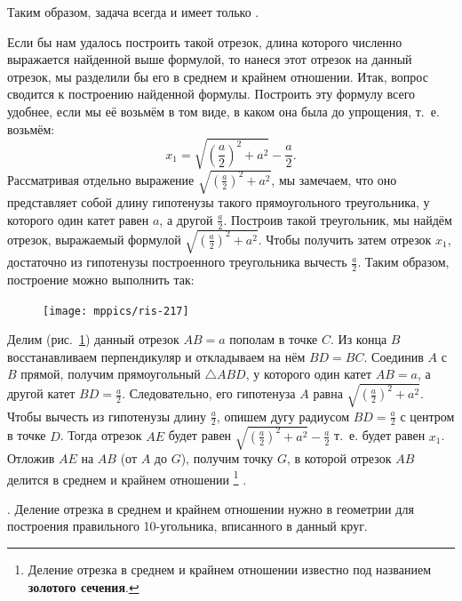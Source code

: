 \documentclass[oneside]{book}
\begin{document}
Таким образом, задача всегда  и имеет только . %

Если бы нам удалось построить такой отрезок, длина которого численно выражается найденной выше формулой, то нанеся этот отрезок на данный отрезок, мы разделили бы его в среднем и крайнем отношении.
Итак, вопрос сводится к построению найденной формулы.
Построить эту формулу всего удобнее, если мы её возьмём в том виде, в каком она была до упрощения, т.~е. возьмём:
\[x_1= \sqrt{\left(\frac a2\right)^2+a^2}-\frac a2.\]
Рассматривая отдельно выражение $\sqrt{\left(\frac a2\right)^2+a^2}$, мы замечаем, что оно представляет собой длину гипотенузы такого прямоугольного треугольника, у которого один катет равен $a$, а другой $\frac a2$.
Построив такой треугольник, мы найдём отрезок, выражаемый формулой $\sqrt{\left(\frac a2\right)^2+a^2}$.
Чтобы получить затем отрезок $x_1$, достаточно из гипотенузы построенного треугольника вычесть $\frac a2$.
Таким образом, построение можно выполнить так:

\begin{figure}
\centering
\texttt{[image: mppics/ris-217]}
\caption{}\label{1938/ris-217}
\end{figure}

Делим (рис.~\ref{1938/ris-217}) данный отрезок $AB=a$ пополам в точке $C$.
Из конца $B$ восстанавливаем перпендикуляр и откладываем на нём $BD = BC$.
Соединив $A$ с $B$ прямой, получим прямоугольный $\triangle ABD$, у которого один катет $AB=a$, а другой катет $BD=\frac a2$.
Следовательно, его гипотенуза $A$ равна $\sqrt{\left(\frac a2\right)^2+a^2}$.
Чтобы вычесть из гипотенузы длину $\frac a2$, опишем дугу радиусом $BD=\frac a2$ с центром в точке $D$.
Тогда отрезок $AE$ будет равен $\sqrt{\left(\frac a2\right)^2+a^2}-\frac a2$ т.~е. будет равен $x_1$.
Отложив $AE$ на $AB$ (от $A$ до $G$), получим точку $G$, в которой отрезок $AB$ делится в среднем и крайнем отношении%
\footnote{Деление отрезка в среднем и крайнем отношении известно под названием \textbf{золотого сечения}.}%
.

.
Деление отрезка в среднем и крайнем отношении нужно в геометрии для построения правильного 10-угольника, вписанного в данный круг.
\end{document}
